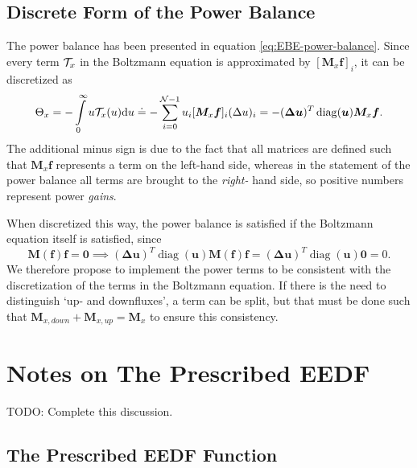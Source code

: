 \documentclass{book}
\newcommand{\bmat}[1]{{\ensuremath{\bm {#1}}}}
\newcommand{\bvec}[1]{{\ensuremath{\bm {#1}}}}
\DeclareMathOperator{\diag}{diag}
\begin{document}
\section{Discrete Form of the Power Balance}
The power balance has been presented in equation \eqref{eq:EBE-power-balance}.
Since every term ${\cal T}_x$ in the Boltzmann equation is approximated by
$[\bmat{M}_x\bvec{f}]_i $, it can be discretized as
\begin{equation}
	\Theta_x
	=
	-\int\limits_0^\infty u{\cal T}_x(u)\dd{u}
	\doteq
	-\sum\limits_{i=0}^{{\cal N}-1}u_i [\bmat{M}_x\bvec{f}]_i (\Delta u)_i
	=
	- (\bvec{\Delta u})^T\diag(\bvec{u})\bmat{M}_x\bvec{f}.
	\label{eq:EBE-power-term}
\end{equation}
The additional minus sign is due to the fact that all matrices are defined
such that $\bmat{M}_x\bvec{f}$ represents a term on the left-hand side, whereas
in the statement of the power balance all terms are brought to the
{\em right-} hand side, so positive numbers represent power {\em gains}.

When discretized this way, the power balance is satisfied if
the Boltzmann equation itself is satisfied, since
\begin{equation}
	\bmat{M}(\bvec{f})\bvec{f} = \bvec{0}
	\implies
	(\bvec{\Delta u})^T\diag(\bvec{u})\bmat{M}(\bvec{f})\bvec{f}
	=
	(\bvec{\Delta u})^T\diag(\bvec{u})\bvec{0} = 0.
\end{equation}
We therefore propose to implement the power terms to be consistent with
the discretization of the terms in the Boltzmann equation. If there is the
need to distinguish `up- and downfluxes', a term can be split, but that
must be done such that $\bmat{M}_{x,down}+\bmat{M}_{x,up} = \bmat{M}_x$
to ensure this consistency.

\chapter{Notes on The Prescribed EEDF}

\label{ch:prescribed}

TODO: Complete this discussion.

\section{The Prescribed EEDF Function}
\end{document}
